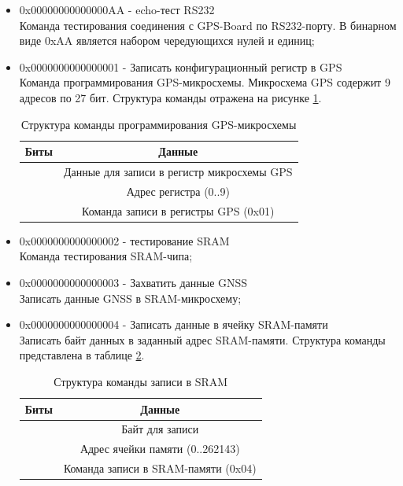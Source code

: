 \begin{itemize}
\item 0x00000000000000AA - echo-тест RS232 \\
	Команда тестирования соединения с GPS-Board по RS232-порту. В бинарном виде 0xAA является набором чередующихся нулей и единиц;

\item 0x0000000000000001 - Записать конфигурационный регистр в GPS \\ 
	Команда программирования GPS-микросхемы. Микросхема GPS содержит 9 адресов по 27 бит. Структура команды отражена на рисунке \ref{tab:gps_programm_comm}.
	\begin{table}[H]
	\begin{center}
	\caption{Структура команды программирования GPS-микросхемы}
	\label{tab:gps_programm_comm}
	\begin{tabular}{|c|c|}
		\hline
			Биты & Данные \\
		\hline
			[39:12] & Данные для записи в регистр микросхемы GPS \\
		\hline
			[11:08] & Адрес регистра (0..9) \\
		\hline
			[07:00] & Команда записи в регистры GPS (0x01) \\
		\hline
	\end{tabular}
	\end{center}
	\end{table}

\item 0x0000000000000002 - тестирование SRAM \\ 
	Команда тестирования SRAM-чипа;

\item 0x0000000000000003 - Захватить данные GNSS \\ 
	Записать данные GNSS в SRAM-микросхему;

\item 0x0000000000000004 - Записать данные в ячейку SRAM-памяти \\ 
	Записать байт данных в заданный адрес SRAM-памяти. Структура команды представлена в таблице \ref{tab:write_sram}.
	\begin{table}[H]
	\begin{center}
	\caption{Структура команды записи в SRAM}
	\label{tab:write_sram}
	\begin{tabular}{|c|c|}
		\hline
			Биты & Данные \\
		\hline
			[33:26] & Байт для записи \\
		\hline
			[25:08] & Адрес ячейки памяти (0..262143) \\
		\hline
			[07:00] & Команда записи в SRAM-памяти (0x04) \\
		\hline
	\end{tabular}
	\end{center}
	\end{table}


\end{itemize}
